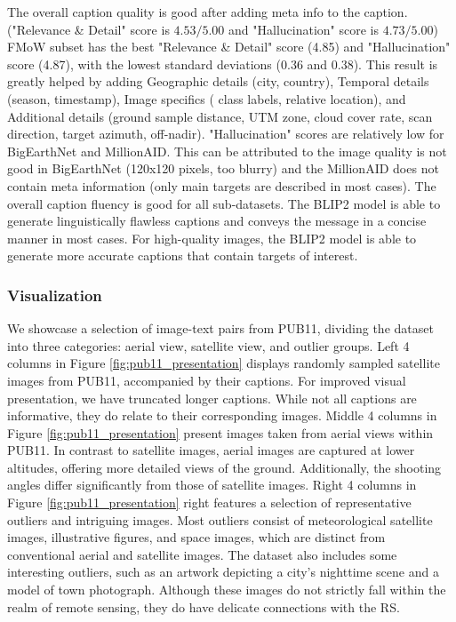 \documentclass[journal]{IEEEtran}
\begin{document}
The overall caption quality is good after adding meta info to the caption. ("Relevance \& Detail" score is $4.53 / 5.00$ and "Hallucination" score is $4.73 / 5.00$)
FMoW subset has the best "Relevance \& Detail" score (4.85) and "Hallucination" score (4.87), with the lowest standard deviations (0.36 and 0.38). This result is greatly helped by adding Geographic details (city, country), Temporal details (season, timestamp), Image specifics ( class labels, relative location), and Additional details (ground sample distance, UTM zone, cloud cover rate, scan direction, target azimuth, off-nadir).
"Hallucination" scores are relatively low for BigEarthNet and MillionAID. This can be attributed to the image quality is not good in BigEarthNet (120x120 pixels, too blurry) and the MillionAID does not contain meta information (only main targets are described in most cases).
The overall caption fluency is good for all sub-datasets. The BLIP2 model is able to generate linguistically flawless captions and conveys the message in a concise manner in most cases.
For high-quality images, the BLIP2 model is able to generate more accurate captions that contain targets of interest.

\subsubsection{Visualization}
\label{appendix:visualization}
We showcase a selection of image-text pairs from PUB11, dividing the dataset into three categories: aerial view, satellite view, and outlier groups. Left 4 columns in Figure \ref{fig:pub11_presentation} displays randomly sampled satellite images from PUB11, accompanied by their captions. For improved visual presentation, we have truncated longer captions. While not all captions are informative, they do relate to their corresponding images. Middle 4 columns in Figure \ref{fig:pub11_presentation} present images taken from aerial views within PUB11. In contrast to satellite images, aerial images are captured at lower altitudes, offering more detailed views of the ground. Additionally, the shooting angles differ significantly from those of satellite images. Right 4 columns in Figure \ref{fig:pub11_presentation} right features a selection of representative outliers and intriguing images. Most outliers consist of meteorological satellite images, illustrative figures, and space images, which are distinct from conventional aerial and satellite images. The dataset also includes some interesting outliers, such as an artwork depicting a city's nighttime scene and a model of town photograph. Although these images do not strictly fall within the realm of remote sensing, they do have delicate connections with the RS.
\end{document}
